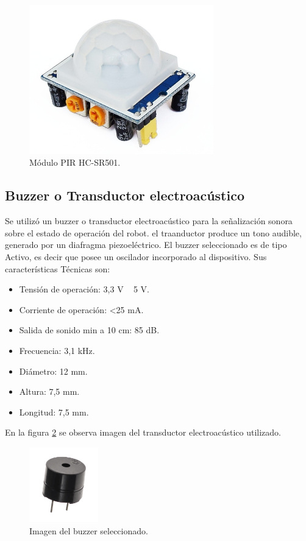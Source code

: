 \begin{figure}[h]
	\centering
	\includegraphics[width=8cm]{./Figures/pir.PNG}
	\caption{Módulo PIR HC-SR501\protect\footnotemark.}
	\label{fig:pir}
\end{figure}



\subsection{Buzzer o Transductor electroacústico}

Se utilizó un buzzer o transductor electroacústico para la señalización sonora sobre el estado de operación del robot. el traanductor produce un tono audible, generado por un diafragma piezoeléctrico. 
El buzzer seleccionado es de tipo Activo, es decir que posee un oscilador incorporado al dispositivo. 
Sus características Técnicas son:

\begin{itemize}
	\item Tensión de operación: 3,3 V ~ 5 V.
	\item Corriente de operación: <25 mA.
	\item Salida de sonido min a 10 cm: 85 dB.
	\item Frecuencia: 3,1 kHz. 	
	\item Diámetro: 12 mm.
	\item Altura: 7,5 mm.
	\item Longitud: 7,5 mm.	
\end{itemize}


En la figura \ref{fig:buzzer2} se observa imagen del transductor electroacústico utilizado.

\begin{figure}[h]
	\centering
	\includegraphics[width=3cm]{./Figures/buzzer2.PNG}
	\caption{Imagen del buzzer seleccionado\protect\footnotemark.}
	\label{fig:buzzer2}
\end{figure}


